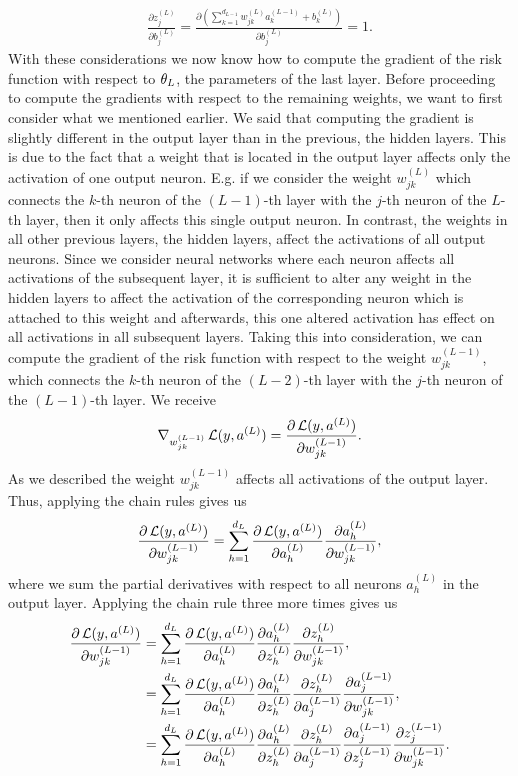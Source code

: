 \begin{align*}
\frac{\partial z_{j}^{(L)}}{\partial b^{(L)}_{j}} = \frac{\partial \left(\sum_{k=1}^{d_{L-1}} w^{(L)}_{jk} a_{k}^{(L-1)} + b_k^{(L)}\right)}{\partial b^{(L)}_{j}} = 1.
\end{align*}
With these considerations we now know how to compute the gradient of the risk function with respect to $\theta_L$, the parameters of the last layer. Before proceeding to compute the gradients with respect to the remaining weights, we want to first consider what we mentioned earlier. We said that computing the gradient is slightly different in the output layer than in the previous, the hidden layers. This is due to the fact that a weight that is located in the output layer affects only the activation of one output neuron. E.g. if we consider the weight $w_{jk}^{(L)}$ which connects the $k$-th neuron of the $(L-1)$-th layer with the $j$-th neuron of the $L$-th layer, then it only affects this single output neuron. In contrast, the weights in all other previous layers, the hidden layers, affect the activations of all output neurons. Since we consider neural networks where each neuron affects all activations of the subsequent layer, it is sufficient to alter any weight in the hidden layers to affect the activation of the corresponding neuron which is attached to this weight and afterwards, this one altered activation has effect on all activations in all subsequent layers. Taking this into consideration, we can compute the gradient of the risk function with respect to the weight $w_{jk}^{(L-1)}$, which connects the $k$-th neuron of the $(L-2)$-th layer with the $j$-th neuron of the $(L-1)$-th layer. We receive
\begin{align*}
\nabla_{w^{(L-1)}_{jk}} \operatorname{\mathcal{L}}(y, a^{(L)}) = \frac{\partial \operatorname{\mathcal{L}}(y, a^{(L)})}{\partial w^{(L-1)}_{jk}}.
\end{align*}
As we described the weight $w^{(L-1)}_{jk}$ affects all activations of the output layer. Thus, applying the chain rules gives us
\begin{align*}
\frac{\partial \operatorname{\mathcal{L}}(y, a^{(L)})}{\partial w^{(L-1)}_{jk}} = \sum_{h=1}^{d_L}\frac{\partial \operatorname{\mathcal{L}}(y, a^{(L)})}{\partial a_h^{(L)}} \frac{\partial a_h^{(L)}}{\partial w^{(L-1)}_{jk}},
\end{align*}
where we sum the partial derivatives with respect to all neurons $a_h^{(L)}$ in the output layer. Applying the chain rule three more times gives us
\begin{align*}
\frac{\partial \operatorname{\mathcal{L}}(y, a^{(L)})}{\partial w^{(L-1)}_{jk}} &= \sum_{h=1}^{d_L}\frac{\partial \operatorname{\mathcal{L}}(y, a^{(L)})}{\partial a_h^{(L)}} \frac{\partial a_h^{(L)}}{\partial z_h^{(L)}} \frac{\partial z_h^{(L)}}{\partial w^{(L-1)}_{jk}},\\
&= \sum_{h=1}^{d_L}\frac{\partial \operatorname{\mathcal{L}}(y, a^{(L)})}{\partial a_h^{(L)}} \frac{\partial a_h^{(L)}}{\partial z_h^{(L)}} \frac{\partial z_h^{(L)}}{\partial a_j^{(L-1)}} \frac{\partial a_j^{(L-1)}}{\partial w^{(L-1)}_{jk}},\\
&= \sum_{h=1}^{d_L}\frac{\partial \operatorname{\mathcal{L}}(y, a^{(L)})}{\partial a_h^{(L)}} \frac{\partial a_h^{(L)}}{\partial z_h^{(L)}} \frac{\partial z_h^{(L)}}{\partial a_j^{(L-1)}} \frac{\partial a_j^{(L-1)}}{\partial z_j^{(L-1)}} \frac{\partial z_j^{(L-1)}}{\partial w^{(L-1)}_{jk}}.
\end{align*}
